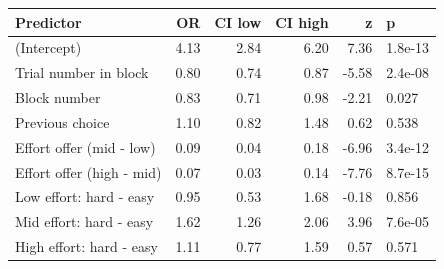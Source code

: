\begin{table}[ht]
\centering
\begin{tabular}{lrrrrl}
  \hline
Predictor & OR & CI low & CI high & z & p \\ 
  \hline
(Intercept) & 4.13 & 2.84 & 6.20 & 7.36 & 1.8e-13 \\ 
  Trial number in block & 0.80 & 0.74 & 0.87 & -5.58 & 2.4e-08 \\ 
  Block number & 0.83 & 0.71 & 0.98 & -2.21 & 0.027 \\ 
  Previous choice & 1.10 & 0.82 & 1.48 & 0.62 & 0.538 \\ 
  Effort offer (mid - low) & 0.09 & 0.04 & 0.18 & -6.96 & 3.4e-12 \\ 
  Effort offer (high - mid) & 0.07 & 0.03 & 0.14 & -7.76 & 8.7e-15 \\ 
  Low effort: hard - easy & 0.95 & 0.53 & 1.68 & -0.18 & 0.856 \\ 
  Mid effort: hard - easy & 1.62 & 1.26 & 2.06 & 3.96 & 7.6e-05 \\ 
  High effort: hard - easy & 1.11 & 0.77 & 1.59 & 0.57 & 0.571 \\ 
   \hline
\end{tabular}
\end{table}
